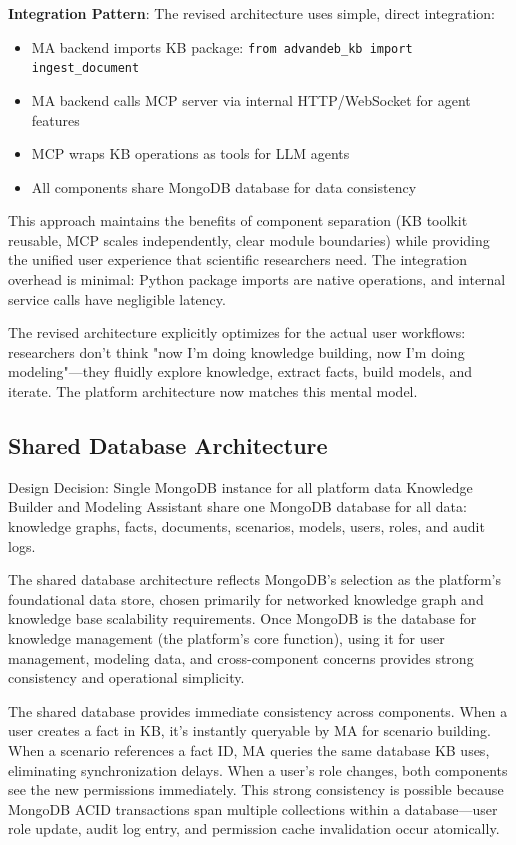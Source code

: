 \documentclass[12pt,a4paper]{article}
\begin{document}
\textbf{Integration Pattern}: The revised architecture uses simple, direct integration:
\begin{itemize}[noitemsep]
    \item MA backend imports KB package: \texttt{from advandeb\_kb import ingest\_document}
    \item MA backend calls MCP server via internal HTTP/WebSocket for agent features
    \item MCP wraps KB operations as tools for LLM agents
    \item All components share MongoDB database for data consistency
\end{itemize}

This approach maintains the benefits of component separation (KB toolkit reusable, MCP scales independently, clear module boundaries) while providing the unified user experience that scientific researchers need. The integration overhead is minimal: Python package imports are native operations, and internal service calls have negligible latency.

The revised architecture explicitly optimizes for the actual user workflows: researchers don't think "now I'm doing knowledge building, now I'm doing modeling"—they fluidly explore knowledge, extract facts, build models, and iterate. The platform architecture now matches this mental model.

\subsection{Shared Database Architecture}

\begin{rationale}{Design Decision: Single MongoDB instance for all platform data}
Knowledge Builder and Modeling Assistant share one MongoDB database for all data: knowledge graphs, facts, documents, scenarios, models, users, roles, and audit logs.
\end{rationale}

The shared database architecture reflects MongoDB's selection as the platform's foundational data store, chosen primarily for networked knowledge graph and knowledge base scalability requirements. Once MongoDB is the database for knowledge management (the platform's core function), using it for user management, modeling data, and cross-component concerns provides strong consistency and operational simplicity.

The shared database provides immediate consistency across components. When a user creates a fact in KB, it's instantly queryable by MA for scenario building. When a scenario references a fact ID, MA queries the same database KB uses, eliminating synchronization delays. When a user's role changes, both components see the new permissions immediately. This strong consistency is possible because MongoDB ACID transactions span multiple collections within a database—user role update, audit log entry, and permission cache invalidation occur atomically.
\end{document}
